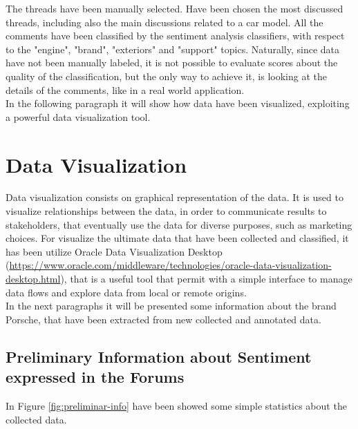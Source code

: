 The threads have been manually selected. Have been chosen the most discussed threads, including also the main discussions related to a car model. All the comments have been classified by the sentiment analysis classifiers, with respect to the "engine", "brand", "exteriors" and "support" topics. Naturally, since data have not been manually labeled, it is not possible to evaluate scores about the quality of the classification, but the only way to achieve it, is looking at the details of the comments, like in a real world application.\\
In the following paragraph it will show how data have been visualized, exploiting a powerful data visualization tool.


\section{Data Visualization}

Data visualization consists on graphical representation of the data. It is used to visualize relationships between the data, in order to communicate results to stakeholders, that eventually use the data for diverse purposes, such as marketing choices. For visualize the ultimate data that have been collected and classified, it has been utilize Oracle Data Visualization Desktop (\url{https://www.oracle.com/middleware/technologies/oracle-data-visualization-desktop.html}), that is a useful tool that permit with a simple interface to manage data flows and explore data from local or remote origins.\\
In the next paragraphs it will be presented some information about the brand Porsche, that have been extracted from new collected and annotated data.


\subsection{Preliminary Information about Sentiment expressed in the Forums}

In Figure \ref{fig:preliminar-info} have been showed some simple statistics about the collected data.

